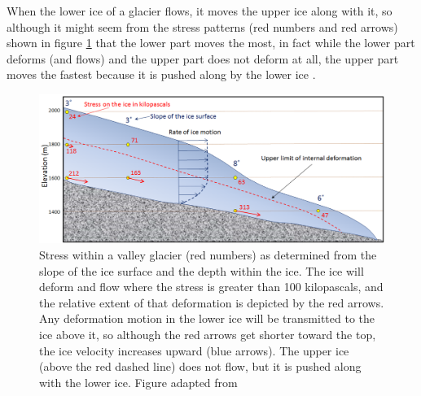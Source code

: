 \documentclass{article}
\begin{document}
When the lower ice of a glacier flows, it moves the upper ice along with it, so although it might seem from the stress patterns (red numbers and red arrows) shown in figure \ref{Flow_ice} that the lower part moves the most, in fact while the lower part deforms (and flows) and the upper part does not deform at all, the upper part moves the fastest because it is pushed along by the lower ice \cite[]{earle2015physical}.

\begin{figure}[!h]
	\centering
	\includegraphics[width=0.7\linewidth]{../fig/ice_flow.png}
	\caption{Stress within a valley glacier (red numbers) as determined from the slope of the ice surface and the depth within the ice. The ice will deform and flow where the stress is greater than 100 kilopascals, and the relative extent of that deformation is depicted by the red arrows. Any deformation motion in the lower ice will be transmitted to the ice above it, so although the red arrows get shorter toward the top, the ice velocity increases upward (blue arrows). The upper ice (above the red dashed line) does not flow, but it is pushed along with the lower ice. Figure adapted from \cite{earle2015physical}}
	\label{Flow_ice}
\end{figure}
\end{document}
